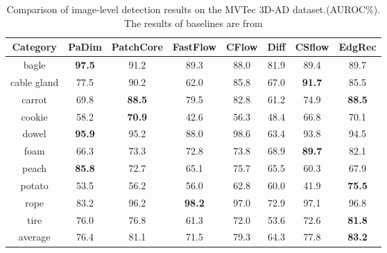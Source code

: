 \documentclass[5p, twocolumn]{elsarticle}[draft]
\begin{document}
\begin{table*}[]
\footnotesize
\caption{Comparison of image-level detection results on the MVTec 3D-AD dataset.(AUROC\%). The results of baselines are from \cite{zheng2022benchmarking}}
\label{Table5}
\centering
\begin{tabular}{c|ccccccc}
\hline
Category    & PaDim \cite{defard2021padim}         & PatchCore \cite{roth2021towards}     & FastFlow \cite{yu2021fastflow}      & CFlow \cite{gudovskiy2022cflow} & Diff \cite{rudolph2021same}  & CSflow \cite{rudolph2022fully}        & EdgRec      \\ \hline
bagle       & \textbf{97.5} & 91.2          & 89.3          & 88.0  & 81.9 & 89.4          & 89.7          \\
cable gland & 77.5          & 90.2          & 62.0          & 85.8  & 67.0 & \textbf{91.7} & 85.5          \\
carrot      & 69.8          & \textbf{88.5} & 79.5          & 82.8  & 61.2 & 74.9          & \textbf{88.5} \\
cookie      & 58.2          & \textbf{70.9} & 42.6          & 56.3  & 48.4 & 66.8          & 70.1          \\
dowel       & \textbf{95.9} & 95.2          & 88.0          & 98.6  & 63.4 & 93.8          & 94.5          \\
foam        & 66.3          & 73.3          & 72.8          & 73.8  & 68.9 & \textbf{89.7} & 82.1          \\
peach       & \textbf{85.8} & 72.7          & 65.1          & 75.7  & 65.5 & 60.3          & 67.9          \\
potato      & 53.5          & 56.2          & 56.0          & 62.8  & 60.0 & 41.9          & \textbf{75.5} \\
rope        & 83.2          & 96.2          & \textbf{98.2} & 97.0  & 72.9 & 97.1          & 96.8          \\
tire        & 76.0          & 76.8          & 61.3          & 72.0  & 53.6 & 72.6          & \textbf{81.8} \\ \hline
average     & 76.4          & 81.1          & 71.5          & 79.3  & 64.3 & 77.8          & \textbf{83.2} \\ \hline
\end{tabular}
\end{table*}
\end{document}
